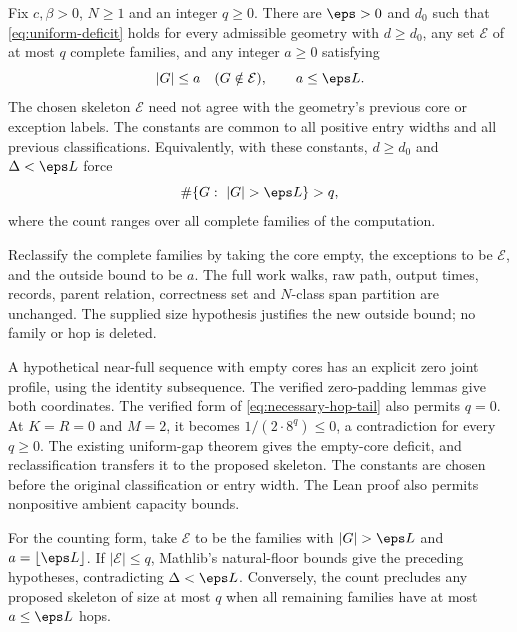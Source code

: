 \begin{corollary}\label{cor:finite-skeleton}
Fix $c,\beta>0$, $N\ge1$ and an integer $q\ge0$.
There are $\eps>0$ and $d_0$ such that \cref{eq:uniform-deficit} holds
for every admissible geometry with $d\ge d_0$, any set $\mathcal E$
of at most $q$ complete families, and any integer $a\ge0$ satisfying
\[
 |G|\le a\quad(G\notin\mathcal E),\qquad a\le\eps L.
\]
The chosen skeleton $\mathcal E$ need not agree with the geometry's
previous core or exception labels. The constants are common to all
positive entry widths and all previous classifications.
Equivalently, with these constants, $d\ge d_0$ and $\Delta<\eps L$ force
\[
 \#\{G:\ |G|>\eps L\}>q,
\]
where the count ranges over all complete families of the computation.
\end{corollary}
\begin{outline}
Reclassify the complete families by taking the core empty, the exceptions
to be $\mathcal E$, and the outside bound to be $a$. The full work walks,
raw path, output times, records, parent relation, correctness set and
$N$-class span partition are unchanged. The supplied size hypothesis
justifies the new outside bound; no family or hop is deleted.

A hypothetical near-full sequence with empty cores has an explicit zero
joint profile, using the identity subsequence. The verified zero-padding
lemmas give both coordinates. The verified form of
\cref{eq:necessary-hop-tail} also permits $q=0$. At $K=R=0$ and $M=2$,
it becomes $1/(2\cdot8^q)\le0$, a contradiction for every $q\ge0$.
The existing uniform-gap theorem gives the empty-core deficit, and
reclassification transfers it to the proposed skeleton. The constants
are chosen before the original classification or entry width. The Lean
proof also permits nonpositive ambient capacity bounds.

For the counting form, take $\mathcal E$ to be the families with
$|G|>\eps L$ and $a=\lfloor\eps L\rfloor$. If $|\mathcal E|\le q$,
Mathlib's natural-floor bounds give the preceding hypotheses, contradicting
$\Delta<\eps L$. Conversely, the count precludes any proposed skeleton of
size at most $q$ when all remaining families have at most $a\le\eps L$ hops.
\end{outline}

